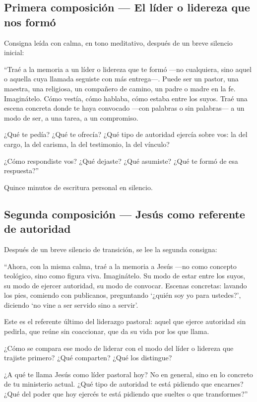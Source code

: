 \documentclass[11pt, a4paper]{article}
\begin{document}
\begin{actividad}
\subsection*{Primera composición --- El líder o lidereza que nos formó}

Consigna leída con calma, en tono meditativo, después de un breve silencio inicial:

\begin{meditacion}
``Traé a la memoria a un líder o lidereza que te formó ---no cualquiera, sino aquel o aquella cuya llamada seguiste con más entrega---. Puede ser un pastor, una maestra, una religiosa, un compañero de camino, un padre o madre en la fe. Imaginátelo. Cómo vestía, cómo hablaba, cómo estaba entre los suyos. Traé una escena concreta donde te haya convocado ---con palabras o sin palabras--- a un modo de ser, a una tarea, a un compromiso.

¿Qué te pedía? ¿Qué te ofrecía? ¿Qué tipo de autoridad ejercía sobre vos: la del cargo, la del carisma, la del testimonio, la del vínculo?

¿Cómo respondiste vos? ¿Qué dejaste? ¿Qué asumiste? ¿Qué te formó de esa respuesta?''
\end{meditacion}

Quince minutos de escritura personal en silencio.

\subsection*{Segunda composición --- Jesús como referente de autoridad}

Después de un breve silencio de transición, se lee la segunda consigna:

\begin{meditacion}
``Ahora, con la misma calma, traé a la memoria a Jesús ---no como concepto teológico, sino como figura viva. Imaginátelo. Su modo de estar entre los suyos, su modo de ejercer autoridad, su modo de convocar. Escenas concretas: lavando los pies, comiendo con publicanos, preguntando `¿quién soy yo para ustedes?', diciendo `no vine a ser servido sino a servir'.

Este es el referente último del liderazgo pastoral: aquel que ejerce autoridad sin pedirla, que reúne sin coaccionar, que da su vida por los que llama.

¿Cómo se compara ese modo de liderar con el modo del líder o lidereza que trajiste primero? ¿Qué comparten? ¿Qué los distingue?

¿A qué te llama Jesús como líder pastoral hoy? No en general, sino en lo concreto de tu ministerio actual. ¿Qué tipo de autoridad te está pidiendo que encarnes? ¿Qué del poder que hoy ejercés te está pidiendo que sueltes o que transformes?''
\end{meditacion}


\end{actividad}
\end{document}
